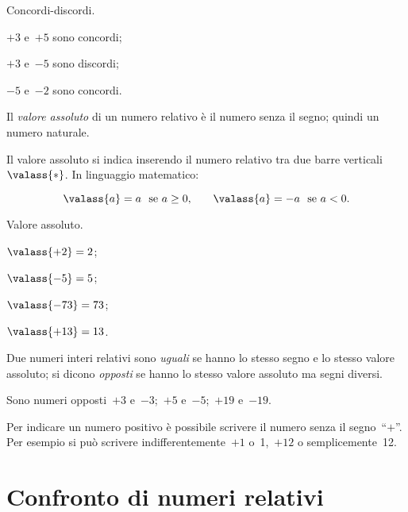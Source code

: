 \begin{exrig}
 \begin{esempio}
 Concordi-discordi.
 \begin{itemize*}
\item $+3$ e~$+5$ sono concordi;
\item $+3$ e~$-5$ sono discordi;
\item $-5$ e~$-2$ sono concordi.
 \end{itemize*}
\end{esempio}
\end{exrig}

\begin{definizione}\label{def:valass}
Il \emph{valore assoluto} di un numero relativo è il numero senza il segno; quindi un numero naturale.
\end{definizione}

Il valore assoluto si indica inserendo il numero relativo tra due barre verticali~$\valass{*}$. In linguaggio
matematico:

\[ \valass{a}=a\text{~~se }a\ge0\text{,}\qquad \valass{a}=-a\text{~~se }a<0.\]

\begin{exrig}
 \begin{esempio}
 Valore assoluto.
 \begin{itemize*}
 \item $\valass{+2}=2$;
 \item $\valass{-5}=5$;
 \item $\valass{-73}=73$;
 \item $\valass{+13}=13$.
 \end{itemize*}
 \end{esempio}
\end{exrig}

\begin{definizione}
 Due numeri interi relativi sono \emph{uguali} se hanno lo stesso segno e lo stesso valore assoluto;
 si dicono \emph{opposti} se hanno lo stesso valore assoluto ma segni diversi.
\end{definizione}

Sono numeri opposti~$+3$ e~$-3$;~$+5$ e~$-5$;~$+19$ e~$-19$.

\osservazione Per indicare un numero positivo è possibile scrivere il numero senza il segno~``$+$''.
Per esempio si può scrivere indifferentemente~$+1$ o~1,~$+12$ o semplicemente~12.

\section{Confronto di numeri relativi}

